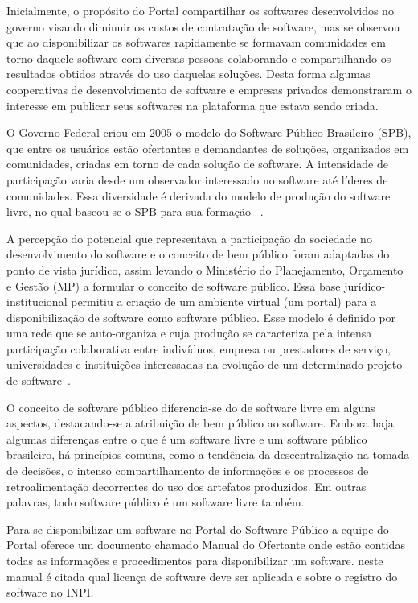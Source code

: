 Inicialmente, o propósito do Portal compartilhar os softwares desenvolvidos
no governo visando diminuir os custos de contratação de software, mas se observou
que ao disponibilizar os softwares rapidamente se formavam comunidades em torno 
daquele software com diversas pessoas colaborando e compartilhando os resultados
obtidos através do uso daquelas soluções. Desta forma algumas cooperativas de 
desenvolvimento de software e empresas privados demonstraram o interesse em
publicar seus softwares na plataforma que estava sendo criada.

O Governo Federal criou em 2005 o modelo do Software
Público Brasileiro (SPB), que entre os usuários estão ofertantes e demandantes de soluções, 
organizados em comunidades, criadas em torno de cada solução de software. A intensidade de participação
varia desde um observador interessado no software até líderes de comunidades. Essa diversidade é
derivada do modelo de produção do software livre, no qual baseou-se o SPB para sua formação
~\cite{alves2009software}. 

A percepção do potencial que representava a participação da sociedade no desenvolvimento do software
e o conceito de bem público foram adaptadas do ponto de vista jurídico, assim levando o Ministério
do Planejamento, Orçamento e Gestão (MP) a formular o conceito de software público. Essa base
jurídico-institucional permitiu a criação de um ambiente virtual (um portal) para a disponibilização
de software como software público. Esse modelo é definido por uma rede que se auto-organiza e cuja
produção se caracteriza pela intensa participação colaborativa entre indivíduos, empresa ou 
prestadores de serviço, universidades e instituições interessadas na evolução de um determinado projeto
de software~\cite{alves2009software}.

O conceito de software público diferencia-se do de software livre em alguns aspectos, destacando-se
a atribuição de bem público ao software. Embora haja algumas diferenças entre o que é um software
livre e um software público brasileiro, há princípios comuns, como a tendência da descentralização na
tomada de decisões, o intenso compartilhamento de informações e os processos de retroalimentação
decorrentes do uso dos artefatos produzidos. Em outras palavras, todo software público é um software
livre também.

Para se disponibilizar um software no Portal do Software Público a equipe do Portal 
oferece um documento chamado Manual do Ofertante onde estão contidas todas as 
informações e procedimentos para disponibilizar um software. neste manual é citada
qual licença de software deve ser aplicada e sobre o registro do software no INPI. 

